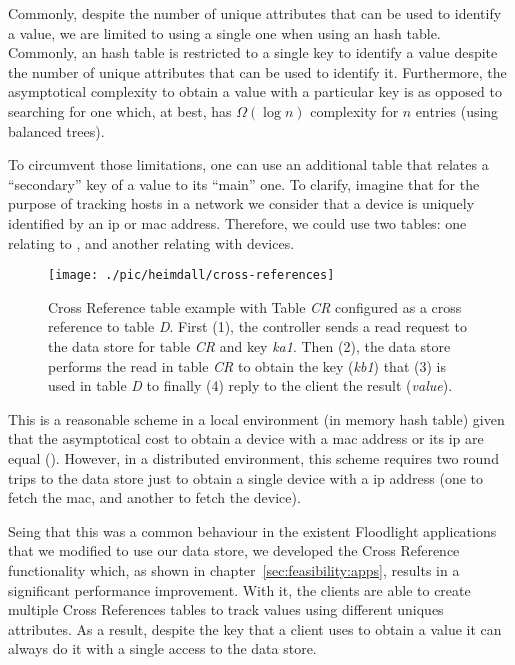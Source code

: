 Commonly, despite the number of unique attributes that can be used to identify a value, we are limited to using a single one when using an hash table. 
Commonly, an hash table is restricted to a single key to identify a value despite the  number of unique attributes  that can be used to identify it. 
Furthermore, the asymptotical complexity to obtain a value with a particular key is  as opposed to searching for one which, at best, has $\Omega(\log n)$ complexity for $n$ entries (using balanced trees). 

To circumvent those limitations, one can use an additional table that relates a ``secondary'' key of a value to its ``main'' one. 
To clarify, imagine that for the purpose of tracking hosts in a network we consider that a device is uniquely identified by an \gls{ip} or \gls{mac} address. 
Therefore, we could use two tables: one relating  to  , and another relating  with devices.

\begin{figure}[ht]
  \centering
  \texttt{[image: ./pic/heimdall/cross-references]}
  \caption[Cross References]{Cross Reference table example with Table \emph{CR} configured as a cross reference to table \emph{D}. First (1), the controller sends a read request to the data store for table \emph{CR} and key \emph{ka1}. Then (2), the data store performs the read in table \emph{CR} to obtain  the key (\emph{kb1}) that (3) is used in table \emph{D} to finally (4) reply to the client the result (\emph{value}). }
  \label{fig:cross-references}
\end{figure}


This is a reasonable scheme in a local environment (in memory hash table) given that the asymptotical cost to obtain a device with 
a \gls{mac} address or its \gls{ip}  are equal (). 
However, in a distributed environment, this scheme requires two round trips to the data store just to obtain a single device with a \gls{ip} address (one to fetch the \gls{mac}, and another to fetch the device). 

Seing that this was a common behaviour in the existent Floodlight applications that we modified to use our data store, we developed the Cross Reference functionality which, as shown in chapter~\ref{sec:feasibility:apps}, results in a significant performance improvement. 
With it, the clients are able to create multiple Cross References tables to track values using different uniques attributes. 
As a result, despite the key that a client uses to obtain a value it can always do it with a single access to the data store. 

